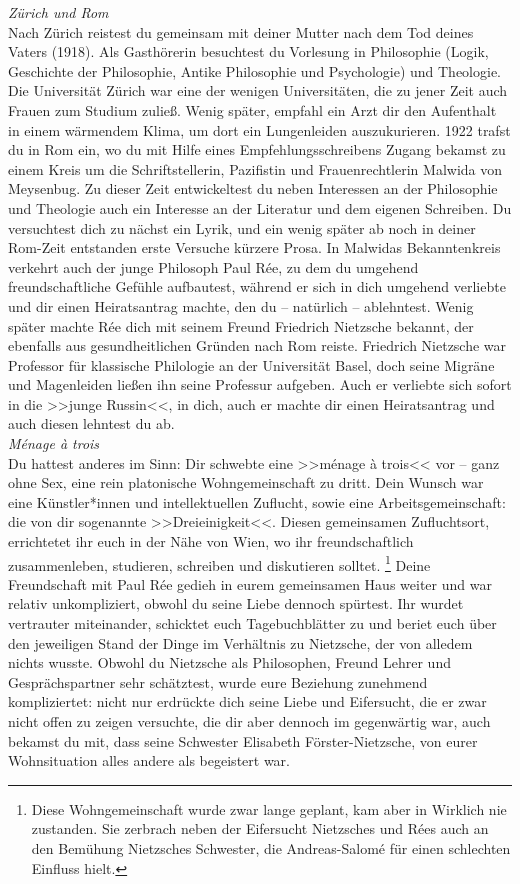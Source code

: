 \documentclass[12pt, a4paper, openany]{report}
\begin{document}
\textit{Zürich und Rom}\\
Nach Zürich reistest du gemeinsam mit deiner Mutter nach dem Tod deines Vaters (1918). 
Als Gasthörerin besuchtest du Vorlesung in Philosophie (Logik, Geschichte der Philosophie, Antike Philosophie und Psychologie) und Theologie. 
Die Universität Zürich war eine der wenigen Universitäten, die zu jener Zeit auch Frauen zum Studium zuließ.
Wenig später, empfahl ein Arzt dir den Aufenthalt in einem wärmendem Klima, um dort ein Lungenleiden auszukurieren. 
1922 trafst du in Rom ein, wo du mit Hilfe eines Empfehlungsschreibens Zugang bekamst zu einem Kreis um die Schriftstellerin, Pazifistin und Frauenrechtlerin Malwida von Meysenbug.
Zu dieser Zeit entwickeltest du neben Interessen an der Philosophie und Theologie auch ein Interesse an der Literatur und dem eigenen Schreiben. 
Du versuchtest dich zu nächst ein Lyrik, und ein wenig später ab noch in deiner Rom-Zeit entstanden erste Versuche kürzere Prosa. 
In Malwidas Bekanntenkreis verkehrt auch der junge Philosoph Paul Rée, zu dem du umgehend freundschaftliche Gefühle aufbautest, während er sich in dich umgehend verliebte und dir einen Heiratsantrag machte, den du -- natürlich -- ablehntest. 
Wenig später machte Rée dich mit seinem Freund Friedrich Nietzsche bekannt, der ebenfalls aus gesundheitlichen Gründen nach Rom reiste. 
Friedrich Nietzsche war Professor für klassische Philologie an der Universität Basel, doch seine Migräne und Magenleiden ließen ihn seine Professur aufgeben. 
Auch er verliebte sich sofort in die >>junge Russin<<, in dich, auch er machte dir einen Heiratsantrag und auch diesen lehntest du ab.\\

\textit{Ménage à trois}\\
Du hattest anderes im Sinn: 
Dir schwebte eine >>ménage à trois<< vor -- ganz ohne Sex, eine rein platonische Wohngemeinschaft zu dritt.
Dein Wunsch war eine Künstler*innen und intellektuellen Zuflucht, sowie eine Arbeitsgemeinschaft: die von dir sogenannte >>Dreieinigkeit<<.
Diesen gemeinsamen Zufluchtsort, errichtetet ihr euch in der Nähe von Wien, wo ihr freundschaftlich zusammenleben, studieren, schreiben und diskutieren solltet.%
\footnote{
  Diese Wohngemeinschaft wurde zwar lange geplant, kam aber in Wirklich nie zustanden. 
  Sie zerbrach neben der Eifersucht Nietzsches und Rées auch an den Bemühung Nietzsches Schwester, die Andreas-Salomé für einen schlechten Einfluss hielt.
}
Deine Freundschaft mit Paul Rée gedieh in eurem gemeinsamen Haus weiter und war relativ unkompliziert, obwohl du seine Liebe dennoch spürtest. 
Ihr wurdet vertrauter miteinander, schicktet euch Tagebuchblätter zu und beriet euch über den jeweiligen Stand der Dinge im Verhältnis zu Nietzsche, der von alledem nichts wusste. 
Obwohl du Nietzsche als Philosophen, Freund Lehrer und Gesprächspartner sehr schätztest, wurde eure Beziehung zunehmend kompliziertet:
nicht nur erdrückte dich seine Liebe und Eifersucht, die er zwar nicht offen zu zeigen versuchte, die dir aber dennoch im gegenwärtig war, auch bekamst du mit, dass seine Schwester Elisabeth Förster-Nietzsche, von eurer Wohnsituation alles andere als begeistert war.\\
\end{document}
